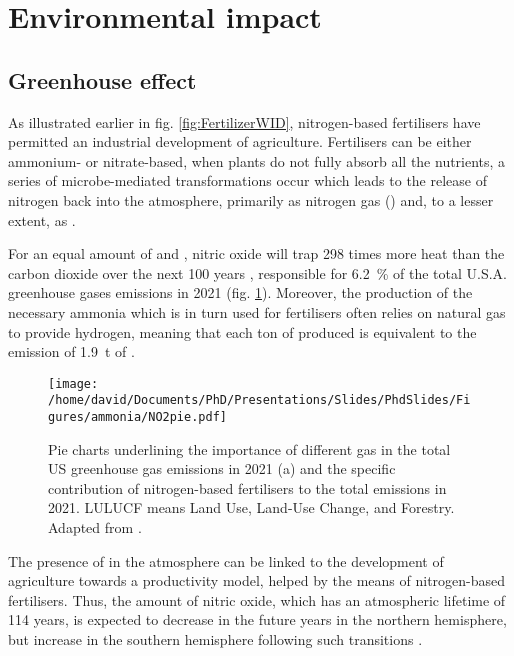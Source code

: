 \section{Environmental impact}

\subsection{Greenhouse effect}

As illustrated earlier in fig. \ref{fig:FertilizerWID}, nitrogen-based fertilisers have permitted an industrial development of agriculture.
Fertilisers can be either ammonium- or nitrate-based, when plants do not fully absorb all the nutrients, a series of microbe-mediated transformations occur which leads to the release of nitrogen back into the atmosphere, primarily as nitrogen gas () and, to a lesser extent, as .

For an equal amount of  and , nitric oxide will trap \num{298} times more heat than the carbon dioxide over the next 100 years \parencite{MITCLIMATE}, responsible for \qty{6.2}{\percent} of the total U.S.A. greenhouse gases emissions in 2021 (fig. \ref{fig:PieGreenhouseNO2}).
Moreover, the production of the necessary ammonia which is in turn used for fertilisers often relies on natural gas to provide hydrogen, meaning that each ton of  produced is equivalent to the emission of \qty{1.9}{\tonne} of  \parencite{Rafiqul2005, Chen2018}.

\begin{figure}[!htb]
    \centering
    \texttt{[image: /home/david/Documents/PhD/Presentations/Slides/PhdSlides/Figures/ammonia/NO2pie.pdf]}
    \caption{
    Pie charts underlining the importance of different gas in the total US greenhouse gas emissions in 2021 (a) and the specific contribution of nitrogen-based fertilisers to the total  emissions in 2021.
    LULUCF means Land Use, Land-Use Change, and Forestry.
    Adapted from \cite{EPAGreenhouseGases}.
    }
    \label{fig:PieGreenhouseNO2}
\end{figure}

The presence of  in the atmosphere can be linked to the development of agriculture towards a productivity model, helped by the means of nitrogen-based fertilisers.
Thus, the amount of nitric oxide, which has an atmospheric lifetime of 114 years, is expected to decrease in the future years in the northern hemisphere, but increase in the southern hemisphere following such transitions \parencite{Solomon2007, Davidson2009}.


